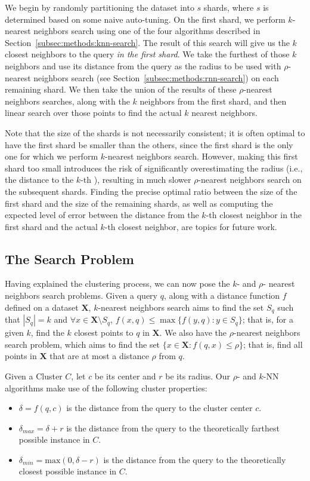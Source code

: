 We begin by randomly partitioning the dataset into $s$ shards, where $s$ is determined based 
on some naive auto-tuning. On the first shard, we perform 
$k$-nearest neighbors search using one of the four algorithms described in Section~\ref{subsec:methods:knn-search}.
The result of this search will give us the $k$ closest neighbors to the query \emph{in the first shard}. We take the furthest of 
those $k$ neighbors and use its distance from the query as the radius to be used with $\rho$-nearest neighbors search (see Section~\ref{subsec:methods:rnn-search}) 
on each remaining shard. We then take the union of the results of these $\rho$-nearest neighbors searches, along with the $k$ neighbors
from the first shard, and then linear search over those points to find the actual $k$ nearest neighbors.


Note that the size of the shards is not necessarily consistent; it is often optimal to have the first shard be smaller than the others,
since the first shard is the only one for which we perform $k$-nearest neighbors search. However, making this first shard too small
introduces the risk of significantly overestimating the radius (i.e., the distance to the $k$-th ), resulting in much slower $\rho$-nearest neighbors search on the subsequent shards.
Finding the precise optimal ratio between the size of the first shard and the size of the remaining shards, as well 
as computing the expected level of error between the distance from the $k$-th closest neighbor in the first shard and the 
actual $k$-th closest neighbor, are topics for future work.

\subsection{The Search Problem}
\label{subsec:methods:general-search}
Having explained the clustering process, we can now pose the $k$- and $\rho$- nearest neighbors search problems.
Given a query $q$, along with a distance function $f$ defined on a dataset $\textbf{X}$, $k$-nearest neighbors search aims to find 
the set $S_q$ such that  $|S_q| = k$ and $\forall x \in \textbf{X} \setminus S_q$, $f(x, q) \leq \max\{f(y, q): y \in S_q \}$; that is,
for a given $k$, find the $k$ closest points to $q$ in $ \textbf{X}$.
We also have the $\rho$-nearest neighbors search problem, which aims to find the set $\{x \in \textbf{X}: f(q, x) \leq \rho \}$; that is, 
find all points in $\textbf{X}$ that are at most a distance $\rho$ from $q$.

Given a Cluster $C$, let $c$ be its center and $r$ be its radius. Our $\rho$- and $k$-NN algorithms make use of the following cluster 
properties:
\begin{itemize}
    \item $\delta = f(q, c)$ is the distance from the query to the cluster center $c$.
    \item $\delta_{max} = \delta + r$ is the distance from the query to the theoretically farthest possible instance in $C$.
    \item $\delta_{min} = \text{max}(0, \delta - r)$ is the distance from the query to the theoretically closest possible instance in $C$.
\end{itemize}


